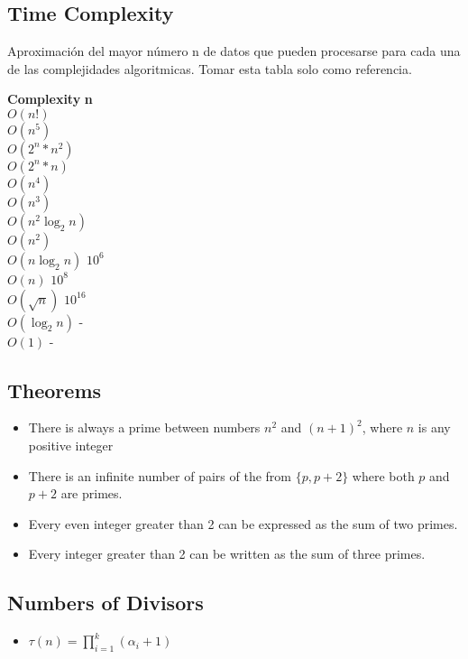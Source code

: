 \documentclass[10pt,letterpaper,twocolumn,twosided]{article}
\begin{document}
\subsection{Time Complexity}

Aproximación del mayor número n de datos que pueden procesarse para cada una de las complejidades algoritmicas. Tomar esta tabla solo como referencia.

\begin{tabbing}
\textbf{Complexity}\hspace{4cm} \=  \textbf{n}\hspace{3cm}   \\ 
$O(n!)$ \\ 
$O(n^{5})$ \\ 
$O(2^{n}*n^{2})$ \\ 
$O(2^{n}*n)$ \\ 
$O(n^{4})$ \\ 
$O(n^{3})$ \\ 
$O(n^{2}\log_{2}n)$ \\ 
$O(n^{2})$ \\ 
$O(n\log_{2}n)$ \> $10^{6}$\\ 
$O(n)$ \> $10^{8}$\\ 
$O(\sqrt{n})$ \> $10^{16}$\\ 
$O(\log_{2}n)$ \> -\\ 
$O(1)$ \> -\\ 
\end{tabbing}



\subsection{Theorems}
\begin{itemize}
\item There is always a prime between numbers $n^2$ and $(n+1)^2$, where $n$ is any positive integer
\item There is an infinite number of pairs of the from $\{p, p + 2\}$ where both $p$ and $p + 2$ are primes.
\item Every even integer greater than 2 can be expressed as the sum of two primes.
\item Every integer greater than 2 can be written as the sum of three primes.
\end{itemize}


\subsection{Numbers of Divisors}
\begin{itemize}
\item $\tau(n) = \prod_{i=1}^{k}(\alpha_i + 1)$
\end{itemize}
\end{document}
